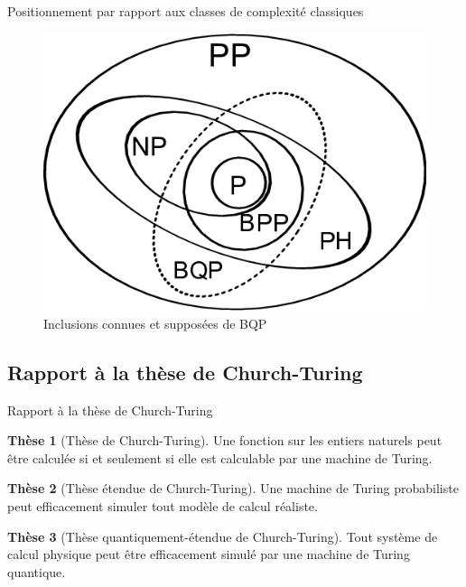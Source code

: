 \documentclass[aspectratio=169]{beamer}
\theoremstyle{plain}
\theoremstyle{definition}
\newtheorem*{thesis}{Thèse}
\begin{document}
\begin{frame}{Positionnement par rapport aux classes de complexité classiques}
    \begin{figure}[!ht]
        \centering
        \includegraphics[scale=0.35]{bqp-inclusions.png}
        \caption{Inclusions connues et supposées de BQP}
    \end{figure}
\end{frame}

\subsection{Rapport à la thèse de Church-Turing}
\begin{frame}{Rapport à la thèse de Church-Turing}
    \begin{thesis}[Thèse de Church-Turing]
        Une fonction sur les entiers naturels peut être calculée si et seulement si elle est calculable par une machine de Turing.
    \end{thesis}
    \begin{thesis}[Thèse étendue de Church-Turing]
        Une machine de Turing probabiliste peut efficacement simuler tout modèle de calcul réaliste.
    \end{thesis}
    \begin{thesis}[Thèse quantiquement-étendue de Church-Turing]
        Tout système de calcul physique peut être efficacement simulé par une machine de Turing quantique.
    \end{thesis}
\end{frame}
\end{document}
